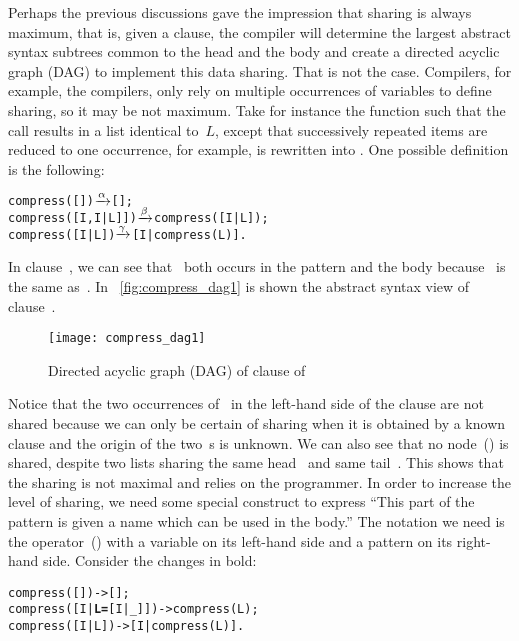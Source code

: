 Perhaps the previous discussions gave the impression that sharing is
always maximum, that is, given a clause, the compiler will determine
the largest abstract syntax subtrees common to the head and the body
and create a directed acyclic graph (DAG) to implement this data
sharing. That is not the case. Compilers, for example, the \Erlang
compilers, only rely on multiple occurrences of variables to define
sharing, so it may be not maximum. Take for instance the function
 such that the call 
results in a list identical to~\(L\), except that successively
repeated items are reduced to one occurrence, for example,
 is rewritten into
\erlcode{[4,a,b,a]}. One possible definition is the following:
\begin{alltt}
compress(      []) \(\smashedrightarrow{\alpha}\) [];
compress([I,I|L]]) \(\smashedrightarrow{\beta}\) compress([I|L]);
compress(   [I|L]) \(\smashedrightarrow{\gamma}\) [I|compress(L)].
\end{alltt}
In clause~\clause{\beta}, we can see that~\erlcode{[I|L]} both occurs
in the pattern and the body because \erlcode{[I,I|L]}~is the same
as~\erlcode{[I|[I|L]]}. In \fig~\vref{fig:compress_dag1} is shown the
abstract syntax view of clause~\clause{\beta}.
\begin{figure}
\centering
\texttt{[image: compress\_dag1]}
\caption{Directed acyclic graph (DAG) of clause \clause{\beta} of
  \label{fig:compress_dag1}}
\end{figure}
Notice that the two occurrences of~ in the left\hyp{}hand
side of the clause are not shared because we can only be certain of
sharing when it is obtained by a known clause and the origin of the
two~s is unknown. We can also see that no
node~(\erlcode{|}) is shared, despite two lists sharing the same
head~ and same tail~. This shows that the
sharing is not maximal and relies on the programmer. In order to
increase the level of sharing, we need some special \Erlang construct
to express ``This part of the pattern is given a name which can be
used in the body.'' The notation we need is the operator~(\erlcode{=})
with a variable on its left\hyp{}hand side and a pattern on its
right\hyp{}hand side. Consider the changes in
bold:\label{code:compress}
\begin{alltt}
compress(         []) -> [];
compress([I|\textbf{L=}[I|_]]) -> compress(L);\hfill% L \emph{is an alias}
compress(      [I|L]) -> [I|compress(L)].
\end{alltt}
